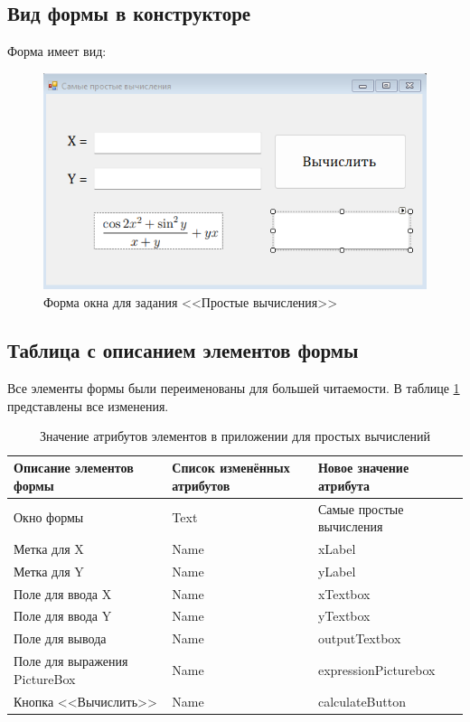 \subsection{Вид формы в конструкторе}
Форма имеет вид:

\begin{figure}
\centering
\includegraphics[width=0.5\linewidth]{images/simple-calculations/form.png}
\caption{Форма окна для задания <<Простые вычисления>>}
\label{simple-calculations-form}
\end{figure}

\subsection{Таблица с описанием элементов формы}
Все элементы формы были переименованы для большей читаемости. В таблице \ref{tab:simple-calculations-form} представлены все изменения.

\begin{table}
\centering
\begin{tabular}{|m{}|m{}|m{}|}
\hline
\textbf{Описание элементов формы} & \textbf{Список изменённых атрибутов} & \textbf{Новое значение атрибута} \\
\hline
\hline
Окно формы & Text & Самые простые вычисления \\
Метка для X & Name & xLabel\\
Метка для Y & Name & yLabel \\
Поле для ввода X & Name & xTextbox \\
Поле для ввода Y & Name & yTextbox \\
Поле для вывода & Name & outputTextbox \\
Поле для выражения PictureBox & Name & expressionPicturebox \\
Кнопка <<Вычислить>> & Name & calculateButton \\
\hline
\end{tabular}
\caption{Значение атрибутов элементов в приложении для простых вычислений}
\label{tab:simple-calculations-form}
\end{table}

